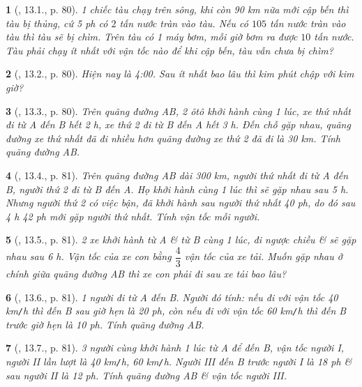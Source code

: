 \documentclass{article}
\newtheorem{baitoan}{}
\begin{document}
\begin{baitoan}[\cite{TLCT_THCS_Toan_6_so_hoc}, 13.1., p. 80]
	1 chiếc tàu chạy trên sông, khi còn {\rm90 km} nữa mới cập bến thì tàu bị thủng, cứ {\rm5 ph} có $2$ tấn nước tràn vào tàu. Nếu có $105$ tấn nước tràn vào tàu thì tàu sẽ bị chìm. Trên tàu có 1 máy bơm, mỗi giờ bơm ra được $10$ tấn nước. Tàu phải chạy ít nhất với vận tốc nào để khi cập bến, tàu vẫn chưa bị chìm?
\end{baitoan}

\begin{baitoan}[\cite{TLCT_THCS_Toan_6_so_hoc}, 13.2., p. 80]
	Hiện nay là {\rm4:00}. Sau ít nhất bao lâu thì kim phút chập với kim giờ?
\end{baitoan}

\begin{baitoan}[\cite{TLCT_THCS_Toan_6_so_hoc}, 13.3., p. 80]
	Trên quãng đường AB, 2 ôtô khởi hành cùng 1 lúc, xe thứ nhất đi từ A đến B hết {\rm2 h}, xe thứ 2 đi từ B đến A hết {\rm3 h}. Đến chỗ gặp nhau, quãng đường xe thứ nhất đã đi nhiều hơn quãng đường xe thứ 2 đã đi là {\rm30 km}. Tính quãng đường AB.
\end{baitoan}

\begin{baitoan}[\cite{TLCT_THCS_Toan_6_so_hoc}, 13.4., p. 81]
	Trên quãng đường AB dài {\rm300 km}, người thứ nhất đi từ A đến B, người thứ 2 đi từ B đến A. Họ khởi hành cùng 1 lúc thì sẽ gặp nhau sau {\rm5 h}. Nhưng người thứ 2 có việc bận, đã khởi hành sau người thứ nhất {\rm40 ph}, do đó sau {\rm4 h 42 ph} mới gặp người thứ nhất. Tính vận tốc mỗi người.
\end{baitoan}

\begin{baitoan}[\cite{TLCT_THCS_Toan_6_so_hoc}, 13.5., p. 81]
	2 xe khởi hành từ A \& từ B cùng 1 lúc, đi ngược chiều \& sẽ gặp nhau sau {\rm6 h}. Vận tốc của xe con bằng $\dfrac{4}{3}$ vận tốc của xe tải. Muốn gặp nhau ở chính giữa quãng đường AB thì xe con phải đi sau xe tải bao lâu?
\end{baitoan}

\begin{baitoan}[\cite{TLCT_THCS_Toan_6_so_hoc}, 13.6., p. 81]
	1 người đi từ A đến B. Người đó tính: nếu đi với vận tốc {\rm40 km{\tt/}h} thì đến B sau giờ hẹn là {\rm20 ph}, còn nếu đi với vận tốc {\rm60 km{\tt/}h} thì đến B trước giờ hẹn là {\rm10 ph}. Tính quãng đường AB.
\end{baitoan}

\begin{baitoan}[\cite{TLCT_THCS_Toan_6_so_hoc}, 13.7., p. 81]
	3 người cùng khởi hành 1 lúc từ A để đến B, vận tốc người I, người II lần lượt là {\rm40 km{\tt/}h, 60 km{\tt/}h}. Người III đến B trước người I là {\rm18 ph} \& sau người II là {\rm12 ph}. Tính quãng đường AB \& vận tốc người III. 
\end{baitoan}
\end{document}
